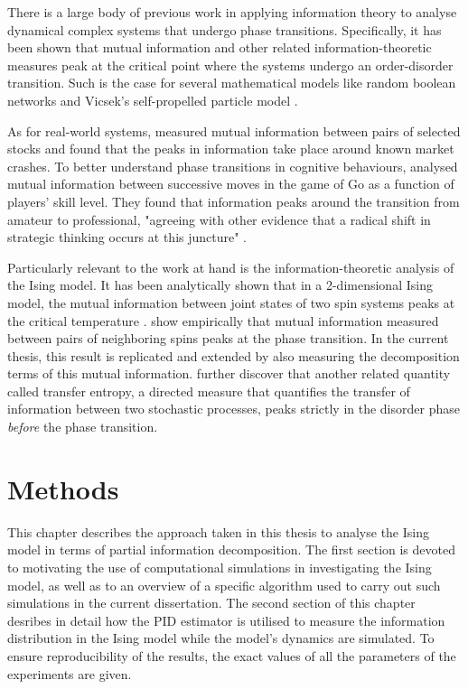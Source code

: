 \documentclass[12pt]{article}
\begin{document}
There is a large body of previous work in applying information theory to analyse dynamical complex systems that undergo phase transitions. Specifically, it has been shown that mutual information and other related information-theoretic measures peak at the critical point where the systems undergo an order-disorder transition. Such is the case for several mathematical models like random boolean networks \cite{lizier-rand-bool-nets} and Vicsek's self-propelled particle model \cite{mi-swarms}. 

As for real-world systems, \cite{mi-financial-markets} measured mutual information between pairs of selected stocks and found that the peaks in information take place around known market crashes. To better understand phase transitions in cognitive behaviours, \cite{mi-go} analysed mutual information between successive moves in the game of Go as a function of players' skill level. They found that information peaks around the transition from amateur to professional, "agreeing with other evidence that a radical shift in strategic thinking occurs at this juncture" \cite{mi-social-systems}. 

Particularly relevant to the work at hand is the information-theoretic analysis of the Ising model. It has been analytically shown that in a 2-dimensional Ising model, the mutual information between joint states of two spin systems peaks at the critical temperature \cite{mi-ising-analytic}. \cite{barnett-ising} show empirically  that mutual information measured between pairs of neighboring spins peaks at the phase transition. In the current thesis, this result is replicated and extended by also measuring the decomposition terms of this mutual information. \cite{barnett-ising} further discover that another related quantity called transfer entropy, a directed measure that quantifies the transfer of information between two stochastic processes, peaks strictly in the disorder phase \textit{before} the phase transition. 

\newpage
\section{Methods}

This chapter describes the approach taken in this thesis to analyse the Ising model in terms of partial information decomposition. The first section is devoted to motivating the use of computational simulations in investigating the Ising model, as well as to an overview of a specific algorithm used to carry out such simulations in the current dissertation. The second section of this chapter desribes in detail how the PID estimator is utilised to measure the information distribution in the Ising model while the model's dynamics are simulated. To ensure reproducibility of the results, the exact values of all the parameters of the experiments are given. 
\end{document}

